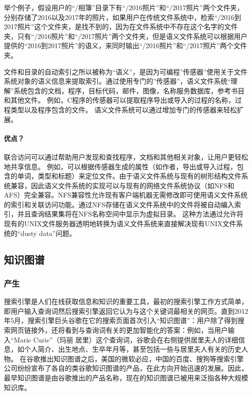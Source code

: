 \documentclass[UTF8]{ctexart}
\begin{document}
举个例子，假设用户的“/相簿”目录下有“/2016照片”和“/2017照片”两个文件夹，分别存储了2016以及2017年的照片，如果用户在传统文件系统中，检索“/2016到2017照片”这个文件夹，是找不到的，因为在文件系统中不存在这个名字的文件夹，只有“/2016照片”和“/2017照片”两个文件夹，但是语义文件系统可以根据用户提供的“2016到2017照片”的语义，来同时输出“/2016照片”和“/2017照片”两个文件夹。

文件和目录的自动索引之所以被称为“语义”，是因为可编程”传感器”使用关于文件系统对象的语义信息来提取索引。通过使用专门的”传感器”，语义文件系统“理解”系统包含的文档，程序，目标代码，邮件，图像，名称服务数据库，参考书目和其他文件。 例如，C程序的传感器可以提取程序导出或导入的过程的名称，过程类型以及程序包含的文件。 语义文件系统可以通过增加专门的传感器来轻松扩展。

\paragraph{优点？}
联合访问可以通过帮助用户发现和查找程序，文档和其他相关对象，让用户更轻松地共享信息。 例如，可以根据传感器生成的属性（如作者，导出或导入过程，包含的单词，类型和标题）来定位文件。由于语义文件系统与现有的树形结构文件系统兼容，因此语义文件系统的实现可以与现有的网络文件系统协议（如NFS和AFS）完全兼容。NFS兼容性允许现有客户端机器无需修改即可使用语义文件系统的索引和关联访问功能。通过NFS存储在语义文件系统中的文件将被自动编入索引，并且查询结果集将在NFS名称空间中显示为虚拟目录。 这种方法通过允许将现有的UNIX文件服务器透明地转换为语义文件系统来直接解决现有UNIX文件系统的“dusty data”问题。

\subsection{知识图谱}
\subsubsection{产生}
搜索引擎是人们在线获取信息和知识的重要工具，最初的搜索引擎工作方式简单，即用户输入查询词然后搜索引擎返回它认为与这个关键词最相关的网页。直到2012年5月，搜索引擎巨头谷歌在它的搜索页面首次引入“知识图谱”：用户除了得到搜索网页链接外，还将看到与查询词有关的更加智能化的答案：例如，当用户输入“Marie Curie”（玛丽 居里）这个查询词，谷歌会在右侧提供居里夫人的详细信息，如个人简介、出生地点、生卒年月等，甚至包括一些与居里夫人有关的历史人物。
在谷歌推出知识图谱之后，美国的微软必应，中国的百度、搜狗等搜索引擎公司纷纷宣布了各自的类谷歌知识图谱的产品，在此方向开始迅速的发展。因此，最早知识图谱是由谷歌推出的产品名称，现在的知识图谱已被用来泛指各种大规模知识库。
\end{document}
